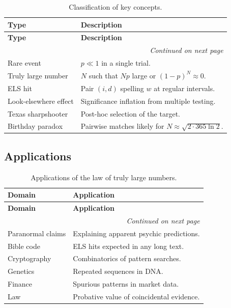 \documentclass[11pt]{amsart}
\theoremstyle{plain}
\theoremstyle{remark}
\begin{document}
\begin{longtable}{lp{10cm}}
	\caption{Classification of key concepts.}\\
	\toprule
	\textbf{Type} & \textbf{Description} \\
	\midrule
	\endfirsthead
	
	\toprule
	\textbf{Type} & \textbf{Description} \\
	\midrule
	\endhead
	
	\midrule
	\multicolumn{2}{r}{\textit{Continued on next page}} \\
	\endfoot
	
	\bottomrule
	\endlastfoot
	
	Rare event & \(p \ll 1\) in a single trial. \\
	Truly large number & \(N\) such that \(Np\) large or \((1-p)^N \approx 0\). \\
	ELS hit & Pair \((i,d)\) spelling \(w\) at regular intervals. \\
	Look-elsewhere effect & Significance inflation from multiple testing. \\
	Texas sharpshooter & Post-hoc selection of the target. \\
	Birthday paradox & Pairwise matches likely for \(N \approx \sqrt{2 \cdot 365 \ln 2}\). \\
\end{longtable}

\subsection{Applications}

\begin{longtable}{lp{10cm}}
	\caption{Applications of the law of truly large numbers.}\\
	\toprule
	\textbf{Domain} & \textbf{Application} \\
	\midrule
	\endfirsthead
	
	\toprule
	\textbf{Domain} & \textbf{Application} \\
	\midrule
	\endhead
	
	\midrule
	\multicolumn{2}{r}{\textit{Continued on next page}} \\
	\endfoot
	
	\bottomrule
	\endlastfoot
	
	Paranormal claims & Explaining apparent psychic predictions. \\
	Bible code & ELS hits expected in any long text. \\
	Cryptography & Combinatorics of pattern searches. \\
	Genetics & Repeated sequences in DNA. \\
	Finance & Spurious patterns in market data. \\
	Law & Probative value of coincidental evidence. \\
\end{longtable}
\end{document}
